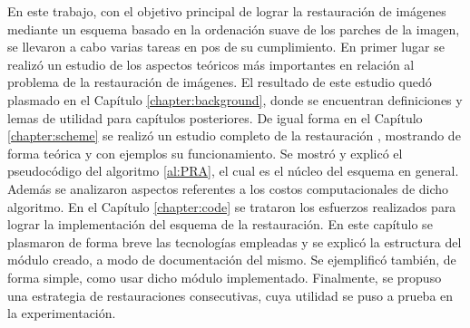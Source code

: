 \begin{conclusions}\label{chapter:conclusions}

\qquad 

En este trabajo, con el objetivo principal de lograr la restauraci\'on de im\'agenes mediante un esquema basado en la ordenaci\'on suave de los parches de la imagen, se llevaron a cabo varias tareas en pos de su cumplimiento. En primer lugar se realiz\'o un estudio de los aspectos te\'oricos m\'as importantes en relaci\'on al problema de la restauraci\'on de im\'agenes. El resultado de este estudio qued\'o plasmado en el Cap\'itulo \ref{chapter:background}, donde se encuentran definiciones y lemas de utilidad para cap\'itulos posteriores. De igual forma en el Cap\'itulo \ref{chapter:scheme} se realiz\'o un estudio completo de la restauraci\'on \SOP, mostrando de forma te\'orica y con ejemplos su funcionamiento. Se mostr\'o y explic\'o el pseudoc\'odigo del algoritmo \ref{al:PRA}, el cual es el n\'ucleo del esquema en general. Adem\'as se analizaron aspectos referentes a los costos computacionales de dicho algoritmo. En el Cap\'itulo \ref{chapter:code} se trataron los esfuerzos realizados para lograr la implementaci\'on del esquema de la restauraci\'on. En este cap\'itulo se plasmaron de forma breve las tecnolog\'ias empleadas y se explic\'o la estructura del m\'odulo creado, a modo de documentaci\'on del mismo. Se ejemplific\'o tambi\'en, de forma simple, como usar dicho m\'odulo implementado. Finalmente, se propuso una estrategia de restauraciones consecutivas, cuya utilidad se puso a prueba en la experimentaci\'on.


\end{conclusions}
